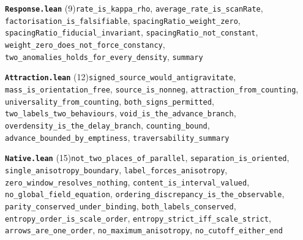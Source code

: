 \documentclass[11pt,a4paper]{article}
\theoremstyle{sudef}
\begin{document}
\noindent\textbf{\texttt{Response.lean}} (9)\quad \texttt{rate\_\allowbreak is\_\allowbreak kappa\_\allowbreak rho}, \texttt{average\_\allowbreak rate\_\allowbreak is\_\allowbreak scanRate}, \texttt{factorisation\_\allowbreak is\_\allowbreak falsifiable}, \texttt{spacingRatio\_\allowbreak weight\_\allowbreak zero}, \texttt{spacingRatio\_\allowbreak fiducial\_\allowbreak invariant}, \texttt{spacingRatio\_\allowbreak not\_\allowbreak constant}, \texttt{weight\_\allowbreak zero\_\allowbreak does\_\allowbreak not\_\allowbreak force\_\allowbreak constancy}, \texttt{two\_\allowbreak anomalies\_\allowbreak holds\_\allowbreak for\_\allowbreak every\_\allowbreak density}, \texttt{summary}\par\smallskip
\noindent\textbf{\texttt{Attraction.lean}} (12)\quad \texttt{signed\_\allowbreak source\_\allowbreak would\_\allowbreak antigravitate}, \texttt{mass\_\allowbreak is\_\allowbreak orientation\_\allowbreak free}, \texttt{source\_\allowbreak is\_\allowbreak nonneg}, \texttt{attraction\_\allowbreak from\_\allowbreak counting}, \texttt{universality\_\allowbreak from\_\allowbreak counting}, \texttt{both\_\allowbreak signs\_\allowbreak permitted}, \texttt{two\_\allowbreak labels\_\allowbreak two\_\allowbreak behaviours}, \texttt{void\_\allowbreak is\_\allowbreak the\_\allowbreak advance\_\allowbreak branch}, \texttt{overdensity\_\allowbreak is\_\allowbreak the\_\allowbreak delay\_\allowbreak branch}, \texttt{counting\_\allowbreak bound}, \texttt{advance\_\allowbreak bounded\_\allowbreak by\_\allowbreak emptiness}, \texttt{traversability\_\allowbreak summary}\par\smallskip
\noindent\textbf{\texttt{Native.lean}} (15)\quad \texttt{not\_\allowbreak two\_\allowbreak places\_\allowbreak of\_\allowbreak parallel}, \texttt{separation\_\allowbreak is\_\allowbreak oriented}, \texttt{single\_\allowbreak anisotropy\_\allowbreak boundary}, \texttt{label\_\allowbreak forces\_\allowbreak anisotropy}, \texttt{zero\_\allowbreak window\_\allowbreak resolves\_\allowbreak nothing}, \texttt{content\_\allowbreak is\_\allowbreak interval\_\allowbreak valued}, \texttt{no\_\allowbreak global\_\allowbreak field\_\allowbreak equation}, \texttt{ordering\_\allowbreak discrepancy\_\allowbreak is\_\allowbreak the\_\allowbreak observable}, \texttt{parity\_\allowbreak conserved\_\allowbreak under\_\allowbreak binding}, \texttt{both\_\allowbreak labels\_\allowbreak conserved}, \texttt{entropy\_\allowbreak order\_\allowbreak is\_\allowbreak scale\_\allowbreak order}, \texttt{entropy\_\allowbreak strict\_\allowbreak iff\_\allowbreak scale\_\allowbreak strict}, \texttt{arrows\_\allowbreak are\_\allowbreak one\_\allowbreak order}, \texttt{no\_\allowbreak maximum\_\allowbreak anisotropy}, \texttt{no\_\allowbreak cutoff\_\allowbreak either\_\allowbreak end}\par\smallskip
\end{document}
